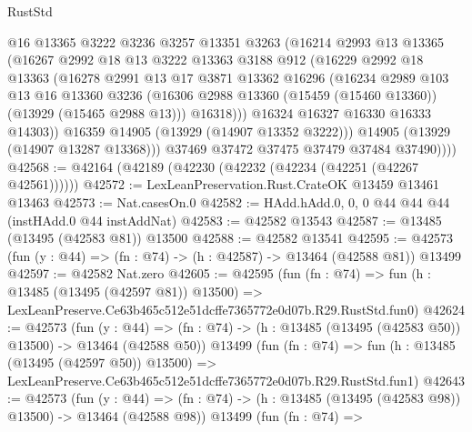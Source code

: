 \begin{lexlean}{RustStd}
\begin{coremodule}
                @16
                @13365
                @3222
                @3236
                @3257
                @13351
                @3263
                (@16214
                  @2993
                  @13
                  @13365
                  (@16267
                    @2992
                    @18
                    @13
                    @3222
                    @13363
                    @3188
                    @912
                    (@16229
                      @2992
                      @18
                      @13363
                      (@16278
                        @2991
                        @13
                        @17
                        @3871
                        @13362
                        @16296
                        (@16234
                          @2989
                          @103
                          @13
                          @16
                          @13360
                          @3236
                          (@16306 @2988 @13360 (@15459 (@15460 @13360)) (@13929 (@15465 @2988 @13)))
                          @16318)))
                    @16324
                    @16327
                    @16330
                    @16333
                    @14303))
                @16359
                @14905
                (@13929 (@14907 @13352 @3222)))
              @14905
              (@13929 (@14907 @13287 @13368)))
            @37469
            @37472
            @37475
            @37479
            @37484
            @37490))))
@42568 := @42164 (@42189 (@42230 (@42232 (@42234 (@42251 (@42267 @42561))))))
@42572 := LexLeanPreservation.Rust.CrateOK @13459 @13461 @13463
@42573 := Nat.casesOn.{0}
@42582 := HAdd.hAdd.{0, 0, 0} @44 @44 @44 (instHAdd.{0} @44 instAddNat)
@42583 := @42582 @13543
@42587 := @13485 (@13495 (@42583 @81)) @13500
@42588 := @42582 @13541
@42595 := @42573 (fun (y : @44) => (fn : @74) -> (h : @42587) -> @13464 (@42588 @81)) @13499
@42597 := @42582 Nat.zero
@42605 := @42595
    (fun (fn : @74) =>
    fun (h : @13485 (@13495 (@42597 @81)) @13500) =>
    LexLeanPreserve.Ce63b465c512e51dcffe7365772e0d07b.R29.RustStd.fun0)
@42624 := @42573
    (fun (y : @44) =>
    (fn : @74) -> (h : @13485 (@13495 (@42583 @50)) @13500) -> @13464 (@42588 @50))
    @13499
    (fun (fn : @74) =>
    fun (h : @13485 (@13495 (@42597 @50)) @13500) =>
    LexLeanPreserve.Ce63b465c512e51dcffe7365772e0d07b.R29.RustStd.fun1)
@42643 := @42573
    (fun (y : @44) =>
    (fn : @74) -> (h : @13485 (@13495 (@42583 @98)) @13500) -> @13464 (@42588 @98))
    @13499
    (fun (fn : @74) =>

\end{coremodule}
\end{lexlean}
